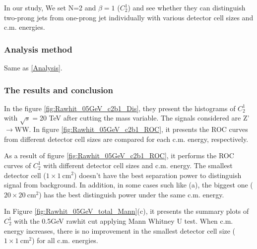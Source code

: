 In our study, We set N=2 and $\beta=1$ ($C_{2}^{1}$) and see whether they can distinguish two-prong jets from one-prong jet individually with various detector cell sizes and c.m. energies.\\
\subsubsection{Analysis method}
Same as \ref{Analysis}.
\subsubsection{The results and conclusion}
In the figure \ref{fig:Rawhit_05GeV_c2b1_Dis}, they present the histograms of $C_{2}^{1}$ with $\sqrt{s}=$20 TeV after cutting the mass variable. The signals considered are Z'$\rightarrow$WW. In figure \ref{fig:Rawhit_05GeV_c2b1_ROC}, it presents the ROC curves from different detector cell sizes are compared for each c.m. energy, respectively. 

As a result of figure \ref{fig:Rawhit_05GeV_c2b1_ROC}, it performs the ROC curves of $C_{2}^{1}$ with different detector cell sizes and c.m. energy. The smallest detector cell ($1\times1~\mathrm{cm}^2$) doesn't have the best separation power to distinguish signal from background. In addition, in some cases such like (a), the biggest one ($20\times20~\mathrm{cm}^2$) has the best distinguish power under the same c.m. energy.

In Figure \ref{fig:Rawhit_05GeV_total_Mann}(c), it presents the summary plots of $C_{2}^{1}$ with the 0.5GeV rawhit cut applying Mann Whitney U test. When c.m. energy increases, there is no improvement in the smallest detector cell size ($1\times1~\mathrm{cm}^2$) for all c.m. energies. 

